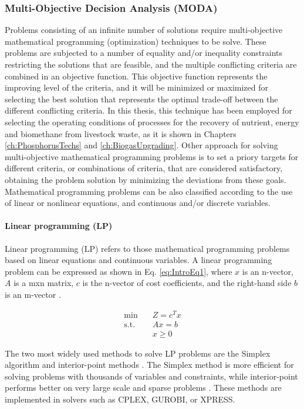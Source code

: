 \begin{refsection}[referencesCh1]
\subsubsection{Multi-Objective Decision Analysis (MODA)}

Problems consisting of an infinite number of solutions require multi-objective mathematical programming (optimization) techniques to be solve. These problems are subjected to a number of equality and/or inequality constraints restricting the solutions that are feasible, and the multiple conflicting criteria are combined in an objective function. This objective function represents the improving level of the criteria, and it will be minimized or maximized for selecting the best solution that represents the optimal trade-off between the different conflicting criteria. In this thesis, this technique has been employed for selecting the operating conditions of processes for the recovery of nutrient, energy and biomethane from livestock waste, as it is shown in Chapters \ref{ch:PhosphorusTechs} and \ref{ch:BiogasUpgrading}. Other approach for solving multi-objective mathematical programming problems is to set a priory targets for different criteria, or combinations of criteria, that are considered satisfactory, obtaining the problem solution by minimizing the deviations from these goals. Mathematical programming problems can be also classified according to the use of linear or nonlinear equations, and continuous and/or discrete variables.

\paragraph{Linear programming (LP)}
Linear programming (LP) refers to those mathematical programming problems based on linear equations and continuous variables. A linear programming problem can be expressed as shown in Eq. \ref{eq:IntroEq1},  where $x$ is an n-vector, $A$ is a mxn matrix, $c$ is the n-vector of cost coefficients, and the right-hand side $b$ is an m-vector \citep{grossmann2021advanced}.

\begin{align}
	\min \quad & Z=c^{T}x \nonumber\\
	\textrm{s.t.} \quad & Ax=b \label{eq:IntroEq1}\\
	&x \geq 0  \nonumber  
\end{align}

The two most widely used methods to solve LP problems are the Simplex algorithm \citep{murty1983linear} and interior-point methods \citep{POTRA2000281}. The Simplex method is more efficient for solving problems with thousands of variables and constraints, while interior-point performs better on very large scale and sparse problems \citep{grossmann2021advanced}. These methods are implemented in solvers such as CPLEX, GUROBI, or XPRESS.


\end{refsection}
